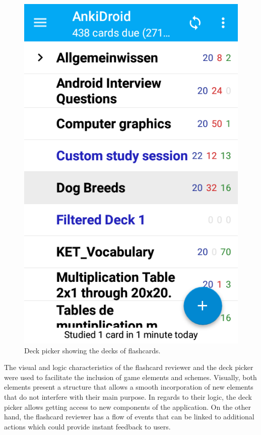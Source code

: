 \begin{figure}[htb]
    \vskip 5mm
        \begin{center}
            \includegraphics[scale=0.4]{./Figures/picker.png}
            \caption{Deck picker showing the decks of flashcards.}
            \label{fig:deck-picker}
        \end{center}
    \vskip -5mm
\end{figure}

The visual and logic characteristics of the flashcard reviewer and the deck picker were used to facilitate the inclusion of game elements and schemes. Visually, both elements present a structure that allows a smooth incorporation of new elements that do not interfere with their main purpose. In regards to their logic, the deck picker allows getting access to new components of the application. On the other hand, the flashcard reviewer has a flow of events that can be linked to additional actions which could provide instant feedback to users.

